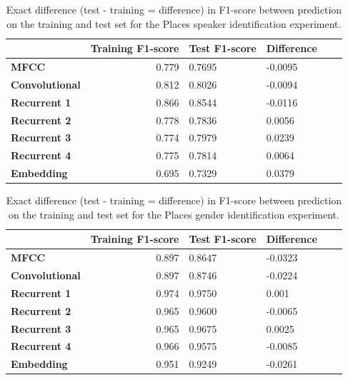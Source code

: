 \documentclass[a4paper, oneside]{book}
\begin{document}
\begin{appendices}
\begin{table}[H]
\begin{center}
\begin{tabular}{|l|r|l|l|l|l|}
\hline              & \bf Training F1-score & \bf Test F1-score & \bf Difference  \\ \hline
\bf MFCC            & 0.779                 & 0.7695            & -0.0095 \\
\bf Convolutional   & 0.812                 & 0.8026            & -0.0094 \\ 
\bf Recurrent 1     & 0.866                 & 0.8544            & -0.0116 \\
\bf Recurrent 2     & 0.778                 & 0.7836            & 0.0056 \\
\bf Recurrent 3     & 0.774                 & 0.7979            & 0.0239 \\
\bf Recurrent 4     & 0.775                 & 0.7814            & 0.0064 \\
\bf Embedding       & 0.695                 & 0.7329            & 0.0379 \\
\hline
\end{tabular}
\end{center}
\caption{\label{table:exact-difference-places-speaker} Exact difference (test - training = difference) in F1-score between prediction on the training and test set for the Places speaker identification experiment.  }
\end{table}

\begin{table}[H]
\begin{center}
\begin{tabular}{|l|r|l|l|l|l|}
\hline              & \bf Training F1-score & \bf Test F1-score & \bf Difference  \\ \hline
\bf MFCC            & 0.897                 & 0.8647            & -0.0323 \\
\bf Convolutional   & 0.897                 & 0.8746            & -0.0224 \\ 
\bf Recurrent 1     & 0.974                 & 0.9750            & 0.001 \\
\bf Recurrent 2     & 0.965                 & 0.9600            & -0.0065 \\
\bf Recurrent 3     & 0.965                 & 0.9675            & 0.0025 \\
\bf Recurrent 4     & 0.966                 & 0.9575            & -0.0085 \\
\bf Embedding       & 0.951                 & 0.9249            & -0.0261 \\
\hline
\end{tabular}
\end{center}
\caption{\label{table:exact-difference-places-gender} Exact difference (test - training = difference) in F1-score between prediction on the training and test set for the Places gender identification experiment.  }
\end{table}

\end{appendices}
\end{document}
